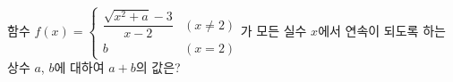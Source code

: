 함수 $f(x)=\begin{cases} \dfrac{\sqrt{x^2+a}-3}{x-2} & (x\ne 2) \\ b & (x=2) \end{cases}$가 모든 실수 $x$에서 연속이 되도록 하는 상수 $a$, $b$에 대하여 $a+b$의 값은?
